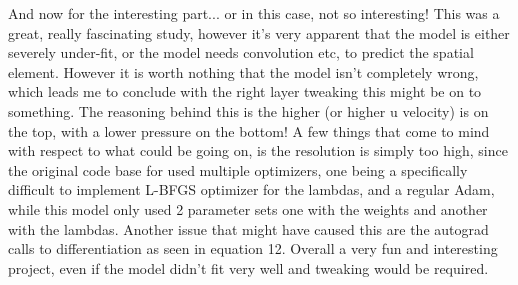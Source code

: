 \documentclass{article}
\begin{document}
	And now for the interesting part... or in this case, not so interesting! This was a great, really fascinating study, however it's very apparent that the model is either severely under-fit,
	or the model needs convolution etc, to predict the spatial element. However it is worth nothing that the model isn't completely wrong, which leads me to conclude with the right layer tweaking this might be on to something. The reasoning behind this is the higher (or higher u velocity) is on the top, with a lower pressure on the bottom! A few things that come to mind with respect to what could be going on, is the resolution is simply too high, since the original code base for \citeauthor{DBLP:journals/corr/abs-1711-10566} used multiple optimizers, one being a specifically difficult to implement L-BFGS optimizer for the lambdas, and a regular Adam, while this model only used 2 parameter sets one with the weights and another with the lambdas. Another issue that might have caused this are the autograd calls to differentiation as seen in equation 12. Overall a very fun and interesting project, even if the model didn't fit very well and tweaking would be required. 
\end{document}
